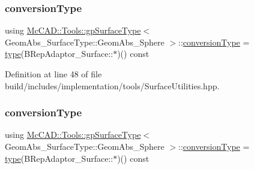 \subsubsection{\texorpdfstring{conversion\+Type}{conversionType}\hspace{0.1cm}{\footnotesize\ttfamily [1/2]}}
{\footnotesize\ttfamily using \hyperlink{structMcCAD_1_1Tools_1_1gpSurfaceType}{Mc\+C\+A\+D\+::\+Tools\+::gp\+Surface\+Type}$<$ Geom\+Abs\+\_\+\+Surface\+Type\+::\+Geom\+Abs\+\_\+\+Sphere $>$\+::\hyperlink{structMcCAD_1_1Tools_1_1gpSurfaceType_3_01GeomAbs__SurfaceType_1_1GeomAbs__Sphere_01_4_a4a908dc9b85bfc9f6ec822daf9608b5e}{conversion\+Type} =  \hyperlink{structMcCAD_1_1Tools_1_1gpSurfaceType_3_01GeomAbs__SurfaceType_1_1GeomAbs__Sphere_01_4_aba535c4821b1722f8b9cf952ffeb976e}{type}(B\+Rep\+Adaptor\+\_\+\+Surface\+::$\ast$)() const}



Definition at line 48 of file build/includes/implementation/tools/\+Surface\+Utilities.\+hpp.

\mbox{\label{structMcCAD_1_1Tools_1_1gpSurfaceType_3_01GeomAbs__SurfaceType_1_1GeomAbs__Sphere_01_4_a4a908dc9b85bfc9f6ec822daf9608b5e}} 
\subsubsection{\texorpdfstring{conversion\+Type}{conversionType}\hspace{0.1cm}{\footnotesize\ttfamily [2/2]}}
{\footnotesize\ttfamily using \hyperlink{structMcCAD_1_1Tools_1_1gpSurfaceType}{Mc\+C\+A\+D\+::\+Tools\+::gp\+Surface\+Type}$<$ Geom\+Abs\+\_\+\+Surface\+Type\+::\+Geom\+Abs\+\_\+\+Sphere $>$\+::\hyperlink{structMcCAD_1_1Tools_1_1gpSurfaceType_3_01GeomAbs__SurfaceType_1_1GeomAbs__Sphere_01_4_a4a908dc9b85bfc9f6ec822daf9608b5e}{conversion\+Type} =  \hyperlink{structMcCAD_1_1Tools_1_1gpSurfaceType_3_01GeomAbs__SurfaceType_1_1GeomAbs__Sphere_01_4_aba535c4821b1722f8b9cf952ffeb976e}{type}(B\+Rep\+Adaptor\+\_\+\+Surface\+::$\ast$)() const}



